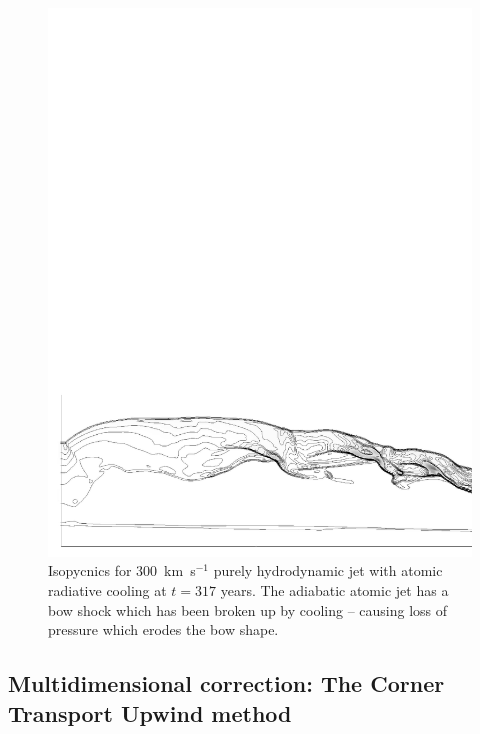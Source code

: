 \begin{figure}[t]
\centering
\includegraphics[width=15cm]{cooling}
\caption{
Isopycnics for 300~km~s$^{-1}$ purely hydrodynamic jet with atomic radiative cooling at $t=317$ years.
The adiabatic atomic jet has a bow shock which has been broken up by cooling -- causing loss of pressure which erodes the bow shape. 
}
\label{fig:2-1} %
\end{figure}




\subsection{Multidimensional correction: The Corner Transport Upwind method}
\label{Multidimensional}
